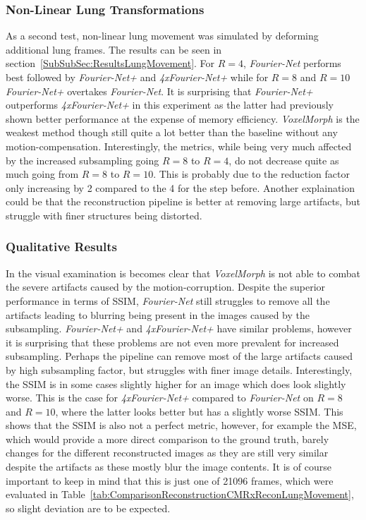 \subsubsection{Non-Linear Lung Transformations}
As a second test, non-linear lung movement was simulated by deforming additional lung frames. The results can be seen in section~\ref{SubSubSec:ResultsLungMovement}. For $R=4$, \emph{Fourier-Net} performs best followed by \emph{Fourier-Net+} and \emph{4xFourier-Net+} while for $R=8$ and $R=10$ \emph{Fourier-Net+} overtakes \emph{Fourier-Net}. It is surprising that \emph{Fourier-Net+} outperforms \emph{4xFourier-Net+} in this experiment as the latter had previously shown better performance at the expense of memory efficiency. \emph{VoxelMorph} is the weakest method though still quite a lot better than the baseline without any motion-compensation. Interestingly, the metrics, while being very much affected by the increased subsampling going $R=8$ to $R=4$, do not decrease quite as much going from $R=8$ to $R=10$. This is probably due to the reduction factor only increasing by 2 compared to the 4 for the step before. Another explaination could be that the reconstruction pipeline is better at removing large artifacts, but struggle with finer structures being distorted.

\subsubsection{Qualitative Results}
In the visual examination is becomes clear that \emph{VoxelMorph} is not able to combat the severe artifacts caused by the motion-corruption. Despite the superior performance in terms of SSIM, \emph{Fourier-Net} still struggles to remove all the artifacts leading to blurring being present in the images caused by the subsampling. \emph{Fourier-Net+} and \emph{4xFourier-Net+} have similar problems, however it is surprising that these problems are not even more prevalent for increased subsampling. Perhaps the pipeline can remove most of the large artifacts caused by high subsampling factor, but struggles with finer image details. Interestingly, the SSIM is in some cases slightly higher for an image which does look slightly worse. This is the case for \emph{4xFourier-Net+} compared to \emph{Fourier-Net} on $R=8$ and $R=10$, where the latter looks better but has a slightly worse SSIM. This shows that the SSIM is also not a perfect metric, however, for example the MSE, which would provide a more direct comparison to the ground truth, barely changes for the different reconstructed images as they are still very similar despite the artifacts as these mostly blur the image contents. It is of course important to keep in mind that this is just one of 21096 frames, which were evaluated in Table~\ref{tab:ComparisonReconstructionCMRxReconLungMovement}, so slight deviation are to be expected.

